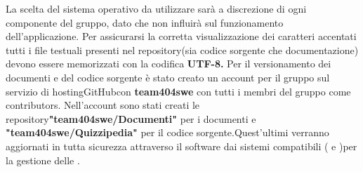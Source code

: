 \documentclass[a4paper,11pt]{article}
\begin{document}
		La scelta del sistema operativo da utilizzare sarà a discrezione di ogni componente del gruppo, dato che non influirà sul funzionamento dell'applicazione.
		Per assicurarsi la corretta visualizzazione dei caratteri accentati tutti i file testuali presenti nel repository\addglos(sia codice sorgente che documentazione) devono essere memorizzati con la codifica\textbf{ UTF-8\addglos.}
		Per il versionamento dei documenti e del codice sorgente è stato creato un account per il gruppo sul servizio di hosting\addglos GitHub\addglos con  \textbf{team404swe\addglos} con tutti i membri del gruppo come contributors\addglos . Nell'account sono stati creati le repository\addglos \textbf{"team404swe/Documenti"} per i documenti e \textbf{"team404swe/Quizzipedia"\addglos} per il codice sorgente.Quest'ultimi verranno aggiornati in tutta sicurezza attraverso  il software \textbf{} dai sistemi compatibili ( e )per la gestione delle  . 
				
\end{document}
